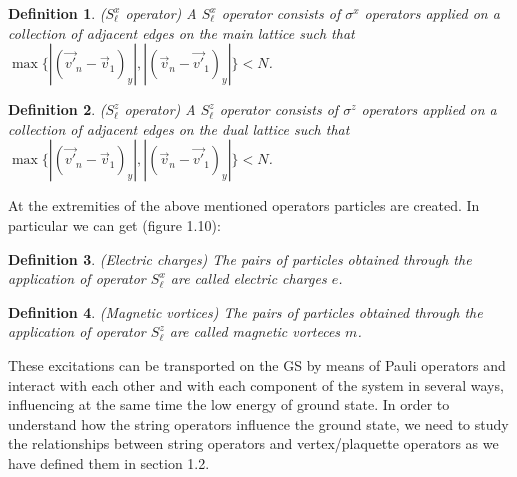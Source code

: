\documentclass{Configuration_Files/PoliMi3i_thesis}
\newtheorem{definition}{Definition}[chapter]
\begin{document}
\begin{definition}($S^x_\ell$ operator)
	A $S^x_\ell$ operator consists of $\sigma^x$ operators applied on a collection of adjacent edges on the main lattice such that $\max \{ |(\vec{v'}_n-\vec{v}_1)_y|, |(\vec{v}_n-\vec{v'}_1)_y| \} < N$.
\end{definition}

\begin{definition}($S^z_\ell$ operator)
	A $S^z_\ell$ operator consists of $\sigma^z$  operators applied on a collection of adjacent edges on the dual lattice such that $\max \{ |(\vec{v'}_n-\vec{v}_1)_y|, |(\vec{v}_n-\vec{v'}_1)_y| \} < N$.
\end{definition}

At the extremities of the above mentioned operators particles are created. In particular we can get (figure 1.10):

\begin{definition}(Electric charges)
	The pairs of particles obtained through the application of operator $S^x_\ell$ are called electric charges $e$.
\end{definition}

\begin{definition}(Magnetic vortices)
	The pairs of particles obtained through the application of operator $S^z_\ell$ are called magnetic vorteces $m$.
\end{definition}

These excitations can be transported on the GS by means of Pauli operators and interact with each other and with each component of the system in several ways, influencing at the same time the low energy of ground state.\newline
In order to understand how the string operators influence the ground state, we need to study the relationships between string operators and vertex/plaquette operators as we have defined them in section 1.2.\newline
\end{document}
